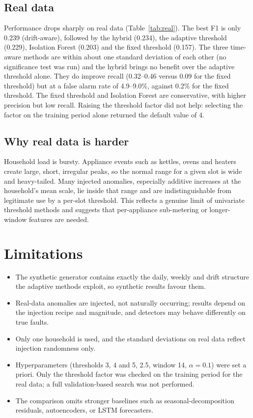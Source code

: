 \documentclass[conference]{IEEEtran}
\begin{document}
\subsection{Real data}
Performance drops sharply on real data (Table~\ref{tab:real}). The best F1 is only 0.239 (drift-aware), followed by the hybrid (0.234), the adaptive threshold (0.229), Isolation Forest (0.203) and the fixed threshold (0.157). The three time-aware methods are within about one standard deviation of each other (no significance test was run) and the hybrid brings no benefit over the adaptive threshold alone. They do improve recall (0.32--0.46 versus 0.09 for the fixed threshold) but at a false alarm rate of 4.9--9.0\%, against 0.2\% for the fixed threshold. The fixed threshold and Isolation Forest are conservative, with higher precision but low recall. Raising the threshold factor did not help: selecting the factor on the training period alone returned the default value of 4.

\subsection{Why real data is harder}
Household load is bursty. Appliance events such as kettles, ovens and heaters create large, short, irregular peaks, so the normal range for a given slot is wide and heavy-tailed. Many injected anomalies, especially additive increases at the household's mean scale, lie inside that range and are indistinguishable from legitimate use by a per-slot threshold. This reflects a genuine limit of univariate threshold methods and suggests that per-appliance sub-metering or longer-window features are needed.

\section{Limitations}
\begin{itemize}
\item The synthetic generator contains exactly the daily, weekly and drift structure the adaptive methods exploit, so synthetic results favour them.
\item Real-data anomalies are injected, not naturally occurring; results depend on the injection recipe and magnitude, and detectors may behave differently on true faults.
\item Only one household is used, and the standard deviations on real data reflect injection randomness only.
\item Hyperparameters (thresholds 3, 4 and 5, 2.5, window 14, $\alpha=0.1$) were set a priori. Only the threshold factor was checked on the training period for the real data; a full validation-based search was not performed.
\item The comparison omits stronger baselines such as seasonal-decomposition residuals, autoencoders, or LSTM forecasters.
\end{itemize}
\end{document}
